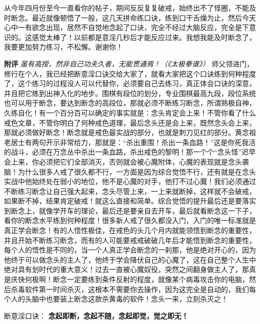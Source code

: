 \begin{case}
    从今年四月份至今一直看你的帖子，期间反反复复破戒，始终出不了怪圈，不能及时断念。最近就像顿悟了一般，这几天拼命练口诀，练到口干舌燥为止，然后今天心中一有欲念出现，居然不自觉地念起了口诀，完全不经过大脑反应，完全是下意识的。这感觉太棒了！以前都是意淫几秒后才能反应过来。我想我能及时断念了，我要更加努力练习，不松懈。谢谢你！

    \textbf{附评} \textit{虽有高授，然非自己功夫久者，无能贯通焉！（《太极拳谱》）} 师父领进门，修行在个人，我已经把断意淫口诀交给大家了，就看大家把这个口诀练到何种程度了，这个练习的过程没人可以代替你，必须要自己去练习，真正体会口诀的深意，并且把它练到出神入化的地步。围棋有段位的划分，专业围棋最高九段，段位系统也可以用于断念，要达到断念的高段位，那就必须不断练习断念，所谓熟极自神，久练自化！有一个百分百可以确定的事实就是：念头肯定会上来！不管你看了什么戒色文章，不管你明白了何种戒色道理，最后念头还是会上来，既然念头会上来，那就必须做好断念！断念就是戒色最实战的部分，也就是刺刀见红的部分。黄念祖老居士有两句开示非常给力，那就是：“杀出重围！杀出一条血路！”这是你死我活的战斗，必须在万念丛中杀出一条血路，杀出戒色的黎明！那一个个“念头怪”迟早会上来，你必须把它们全部消灭，否则就会被心魔附体，心魔的表现就是念头袭脑！为什么很多人戒了很久都不行，一方面是因为综合觉悟不行，还有就是在念头实战中他始终处在弱小的地位，他不是心魔的对手，他打不过心魔！我们必须通过不断练习断念让自己强大起来，念头尽管上来，一上来就断掉，这样就不会破戒，如果断不掉，结果肯定破戒！就这么直接和简单。综合觉悟的提升最后还是要落实到断念上，就像学开车的理论，最后还是要亲自去开车，最后就看断念这一下子，看你的断念水平练到何种程度！很多新人戒了很久都没入门，入门的唯一标准就是真正学会断念！有的人悟性极佳，在戒色的头几个月内就能领悟到断念的重要性，并且开始不断练习断念，而有的人可能要戒戒破破几年后才能悟到断念的重要性，每个人的悟性是不同的，当一个人真正学会断念的一刹那，他是绝对开心的，因为他终于可以做念头的主人了，他终于学会降伏自己的心魔了，这在自己整个人生中绝对具有划时代的重大意义！过去一直被心魔奴役，突然之间翻身做主人了，那真是庆快何极啊！断念一定要练到条件反射的程度，就像某个病毒攻击你的电脑，然后杀毒软件第一时间杀灭，这根本不需要你去操作，因为这完全是自动的，我们每个人的头脑中也要装上断念这款杀黄毒的软件！念头一来，立刻杀灭之！

    断意淫口诀： \bf 念起即断，念起不随，念起即觉，觉之即无！
\end{case}

